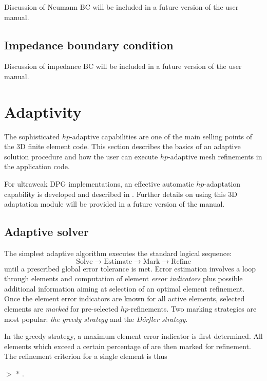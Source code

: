 Discussion of Neumann BC will be included in a future version of the user manual.

\subsection{Impedance boundary condition}
\label{sec:impedance}

Discussion of impedance BC will be included in a future version of the user manual.

\section{Adaptivity}
\label{sec:adaptivity}

The sophisticated $hp$-adaptive capabilities are one of the main selling points of the \hp3D finite element code. This section describes the basics of an adaptive solution procedure and how the user can execute $hp$-adaptive mesh refinements in the application code.

For ultraweak DPG implementations, an effective automatic $hp$-adaptation capability is developed and described in \cite{chakraborty2023hp}. Further details on using this \hp3D adaptation module will be provided in a future version of the manual.

\subsection{Adaptive solver}
\label{sec:adaptive-solver}

The simplest adaptive algorithm executes the standard logical sequence:
\[
	\text{Solve} \longrightarrow
	\text{Estimate} \longrightarrow
	\text{Mark} \longrightarrow
	\text{Refine} 
\]
until a prescribed global error tolerance is met. Error estimation involves a loop through elements and computation of element {\em error indicators} plus possible additional information aiming at selection of an optimal element refinement. Once the element error indicators are known for all active elements, selected elements are {\em marked} for pre-selected $hp$-refinements. Two marking strategies are most popular: {\em the greedy strategy} and the {\em D\"orfler strategy}. 

In the greedy strategy, a maximum element error indicator  is first determined. All elements which exceed a certain percentage of  are then marked for refinement. The refinement criterion for a single element is thus
\begin{center}
	 $>$  .
\end{center}

